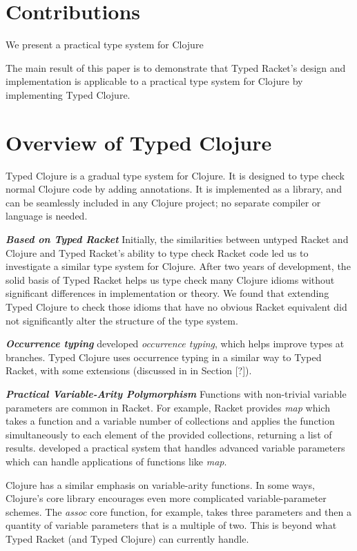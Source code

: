 \documentclass[preprint,10pt]{sigplanconf}
\newcommand\smallsection[1]{\bf \emph{#1}}
\begin{document}
\section{Contributions}

We present a practical type system for Clojure

The main result of this paper is to demonstrate that Typed Racket's design
and implementation is applicable to a practical type system for Clojure
by implementing Typed Clojure.


\section{Overview of Typed Clojure}

Typed Clojure is a gradual type system for Clojure. It is designed
to type check normal Clojure code by adding annotations. It is implemented
as a library, and can be seamlessly included in any Clojure project; no
separate compiler or language is needed.

{\smallsection {Based on Typed Racket}}
Initially, the similarities between untyped Racket and Clojure and Typed Racket's 
ability to type check Racket code led us to investigate a similar type system for Clojure.
After two years of development, the solid basis of Typed Racket 
helps us type check many Clojure idioms without significant differences
in implementation or theory. We found that extending Typed Clojure to check
those idioms that have no obvious Racket equivalent did not significantly alter the structure
of the type system.

{\smallsection {Occurrence typing}}
\citet{TF08,TF10} developed \emph{occurrence typing}, which helps improve types at branches.
Typed Clojure uses occurrence typing in a similar way to Typed Racket, with
some extensions (discussed in in Section [?]). %

{\smallsection {Practical Variable-Arity Polymorphism}}
Functions with non-trivial variable parameters are common in Racket.
For example, Racket provides \emph{map} which takes a function and a
variable number of collections and applies the function simultaneously
to each element of the provided collections, returning a list of results.
\citet*{STF09} developed a practical system that handles advanced variable parameters
which can handle applications of functions like \emph{map}.

Clojure has a similar emphasis on variable-arity functions. In some ways,
Clojure's core library encourages even more complicated variable-parameter schemes.
The \emph{assoc} core function, for example, takes three parameters and
then a quantity of variable parameters that is a multiple of two.
This is beyond what Typed Racket (and Typed Clojure) can currently handle. 
\end{document}
